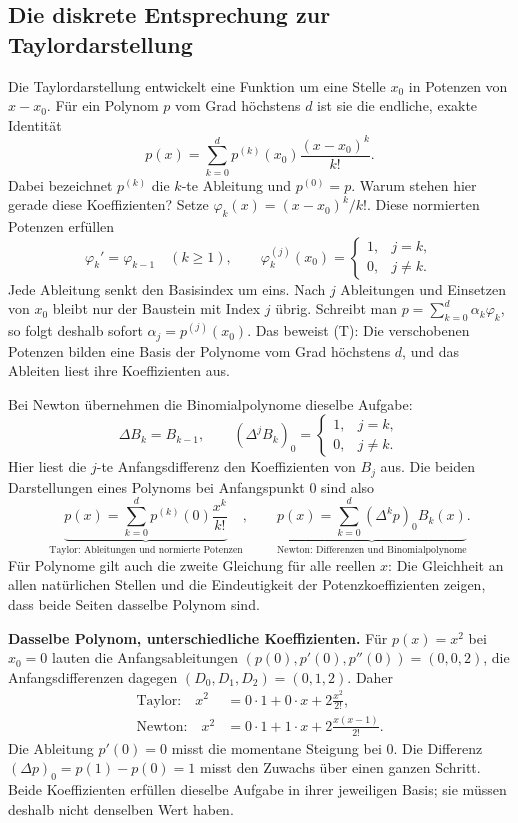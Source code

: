 \subsection*{Die diskrete Entsprechung zur Taylordarstellung}

Die Taylordarstellung entwickelt eine Funktion um eine Stelle $x_0$
in Potenzen von $x-x_0$. Für ein Polynom $p$ vom Grad höchstens $d$
ist sie die endliche, exakte Identität
\begin{equation}\tag{T}\label{newton:taylor}
 \boxed{\displaystyle
 p(x)=\sum_{k=0}^d p^{(k)}(x_0)\frac{(x-x_0)^k}{k!}.}
\end{equation}
Dabei bezeichnet $p^{(k)}$ die $k$-te Ableitung und $p^{(0)}=p$.
Warum stehen hier gerade diese Koeffizienten? Setze
$\varphi_k(x)=(x-x_0)^k/k!$. Diese normierten Potenzen erfüllen
\[
 \varphi_k'=\varphi_{k-1}\quad(k\geq1),\qquad
 \varphi_k^{(j)}(x_0)=
 \begin{cases}1,&j=k,\\0,&j\ne k.\end{cases}
\]
Jede Ableitung senkt den Basisindex um eins. Nach $j$ Ableitungen und
Einsetzen von $x_0$ bleibt nur der Baustein mit Index $j$ übrig.
Schreibt man $p=\sum_{k=0}^d \alpha_k\varphi_k$, so folgt deshalb sofort
$\alpha_j=p^{(j)}(x_0)$. Das beweist (T): Die verschobenen Potenzen bilden
eine Basis der Polynome vom Grad höchstens $d$, und das Ableiten liest
ihre Koeffizienten aus.

Bei Newton übernehmen die Binomialpolynome dieselbe Aufgabe:
\[
 \Delta B_k=B_{k-1},\qquad
 (\Delta^jB_k)_0=
 \begin{cases}1,&j=k,\\0,&j\ne k.\end{cases}
\]
Hier liest die $j$-te Anfangsdifferenz den Koeffizienten von $B_j$ aus.
Die beiden Darstellungen eines Polynoms bei Anfangspunkt $0$ sind also
\[
 \underbrace{p(x)=\sum_{k=0}^d p^{(k)}(0)\frac{x^k}{k!}}_{\text{Taylor: Ableitungen und normierte Potenzen}},
 \qquad
 \underbrace{p(x)=\sum_{k=0}^d(\Delta^kp)_0B_k(x)}_{\text{Newton: Differenzen und Binomialpolynome}}.
\]
Für Polynome gilt auch die zweite Gleichung für alle reellen $x$:
Die Gleichheit an allen natürlichen Stellen und die Eindeutigkeit der
Potenzkoeffizienten zeigen, dass beide Seiten dasselbe Polynom sind.

\textbf{Dasselbe Polynom, unterschiedliche Koeffizienten.}
Für $p(x)=x^2$ bei $x_0=0$ lauten die Anfangsableitungen
$(p(0),p'(0),p''(0))=(0,0,2)$, die Anfangsdifferenzen dagegen
$(D_0,D_1,D_2)=(0,1,2)$. Daher
\[
 \begin{aligned}
 \text{Taylor:}\quad x^2&=0\cdot1+0\cdot x+2\frac{x^2}{2!},\\
 \text{Newton:}\quad x^2&=0\cdot1+1\cdot x+2\frac{x(x-1)}{2!}.
 \end{aligned}
\]
Die Ableitung $p'(0)=0$ misst die momentane Steigung bei $0$.
Die Differenz $(\Delta p)_0=p(1)-p(0)=1$ misst den Zuwachs über einen
ganzen Schritt. Beide Koeffizienten erfüllen dieselbe Aufgabe in ihrer
jeweiligen Basis; sie müssen deshalb nicht denselben Wert haben.

